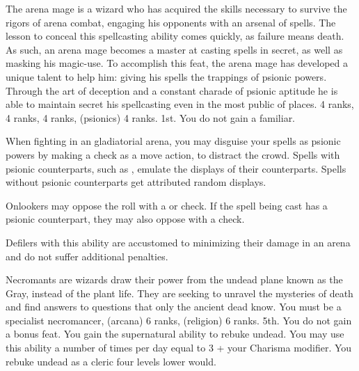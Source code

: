 {The arena mage is a wizard who has acquired the skills necessary to survive the rigors of arena combat, engaging his opponents with an arsenal of spells. The lesson to conceal this spellcasting ability comes quickly, as failure means death. As such, an arena mage becomes a
master at casting spells in secret, as well as masking his magic-use. To accomplish this feat, the arena mage has developed a unique talent to help him: giving his spells the trappings of psionic powers. Through the art of deception and a constant charade of psionic aptitude he is able to maintain secret his spellcasting even in the most public of places.}
{ 4 ranks,  4 ranks,  4 ranks,  (psionics) 4 ranks.}
{1st.}
{You do not gain a familiar.}
{
	When fighting in an gladiatorial arena, you may disguise your spells as psionic powers by making a  check as a move action, to distract the crowd. Spells with psionic counterparts, such as , emulate the displays of their counterparts. Spells without psionic counterparts get attributed random displays.

	Onlookers may oppose the roll with a  or  check. If the spell being cast has a psionic counterpart, they may also oppose with a  check.

	Defilers with this ability are accustomed to minimizing their damage in an arena and do not suffer additional penalties.
}
{Necromants are wizards draw their power from the undead plane known as the Gray, instead of the plant life. They are seeking to unravel the mysteries of death and find answers to questions that only the ancient dead know.}
{You must be a specialist necromancer,  (arcana) 6 ranks,  (religion) 6 ranks.}
{5th.}
{You do not gain a bonus feat.}
{
	You gain the supernatural ability to rebuke undead. You may use this ability a number of times per day equal to 3 + your Charisma modifier. You rebuke undead as a cleric four levels lower would.
}